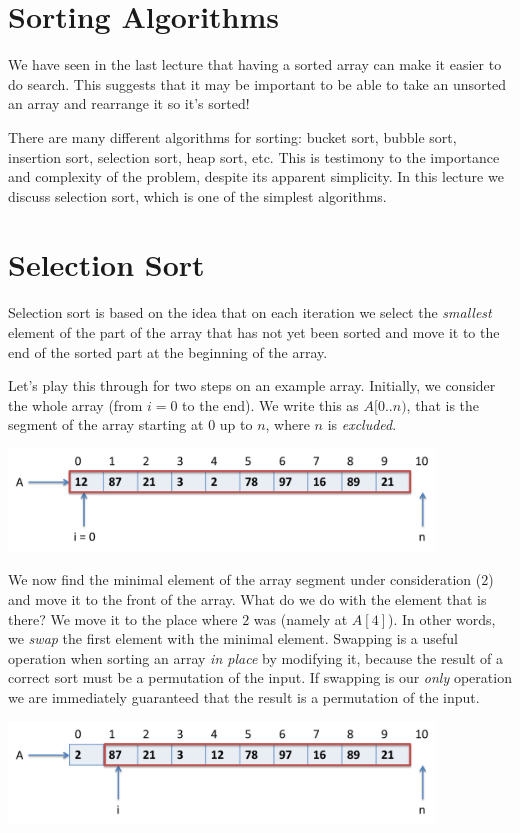 \section{Sorting Algorithms}
\label{sec:bigo:sorts}

We have seen in the last lecture that having a sorted array can make
it easier to do search.  This suggests that it may be important to be
able to take an unsorted an array and rearrange it so it's sorted!

There are many different algorithms for sorting: bucket sort, bubble
sort, insertion sort, selection sort, heap sort, etc.  This is
testimony to the importance and complexity of the problem, despite its
apparent simplicity.
In this lecture we discuss selection sort, which is one of the
simplest algorithms.

\clearpage
\section{Selection Sort}
\label{sec:bigo:selection}

Selection sort is based on the idea that on each iteration we select
the \emph{smallest} element of the part of the array that has not yet
been sorted and move it to the end of the sorted part at the beginning
of the array.

Let's play this through for two steps on an example array.  Initially,
we consider the whole array (from $i = 0$ to the end).  We write
this as $A\lbrack 0{..}n)$, that is the segment of the array starting at
$0$ up to $n$, where $n$ is \emph{excluded}.
\begin{center}
\includegraphics[width=0.85\textwidth]{img/selsort1.png}
\end{center}

We now find the minimal element of the array segment under
consideration ($2$) and move it to the front of the array.  What do we
do with the element that is there?  We move it to the place where $2$
was (namely at $A[4]$).  In other words, we \emph{swap} the first
element with the minimal element.  Swapping is a useful operation when
sorting an array \emph{in place} by modifying it, because the
result of a correct sort must be a permutation of the input.  If swapping is our
\emph{only} operation we are immediately guaranteed that the result is
a permutation of the input.
\begin{center}
\includegraphics[width=0.85\textwidth]{img/selsort2.png}
\end{center}

